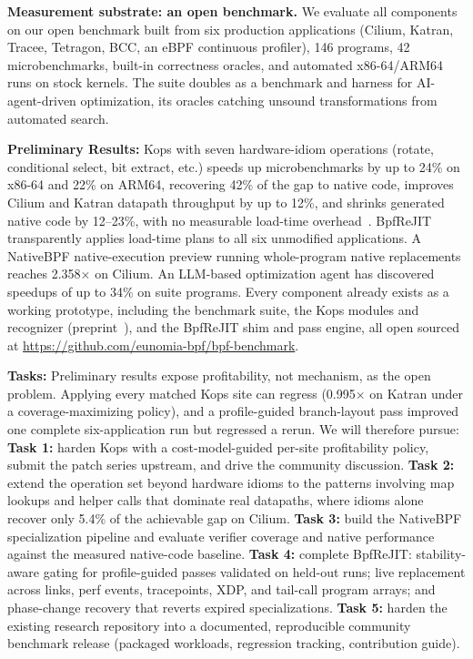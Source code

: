 \noindent\textbf{Measurement substrate: an open benchmark.}  We evaluate all components on our open benchmark built from six production applications (Cilium, Katran, Tracee, Tetragon, BCC, an eBPF continuous profiler), 146 programs, 42 microbenchmarks, built-in correctness oracles, and automated x86-64/ARM64 runs on stock kernels.  The suite doubles as a benchmark and harness for AI-agent-driven optimization, its oracles catching unsound transformations from automated search.

\noindent\textbf{Preliminary Results:} Kops with seven hardware-idiom operations (rotate, conditional select, bit extract, etc.) speeds up microbenchmarks by up to 24\% on x86-64 and 22\% on ARM64, recovering 42\% of the gap to native code, improves Cilium and Katran datapath throughput by up to 12\%, and shrinks generated native code by 12--23\%, with no measurable load-time overhead~\cite{zheng2026kops}.  BpfReJIT transparently applies load-time plans to all six unmodified applications.  A NativeBPF native-execution preview running whole-program native replacements reaches 2.358$\times$ on Cilium.  An LLM-based optimization agent has discovered speedups of up to 34\% on suite programs.  Every component already exists as a working prototype, including the benchmark suite, the Kops modules and recognizer (preprint~\cite{zheng2026kops}), and the BpfReJIT shim and pass engine, all open sourced at \url{https://github.com/eunomia-bpf/bpf-benchmark}.

\noindent\textbf{Tasks:} Preliminary results expose profitability, not mechanism, as the open problem. Applying every matched Kops site can regress (0.995$\times$ on Katran under a coverage-maximizing policy), and a profile-guided branch-layout pass improved one complete six-application run but regressed a rerun.  We will therefore pursue: \textbf{Task 1:} harden Kops with a cost-model-guided per-site profitability policy, submit the patch series upstream, and drive the community discussion.  \textbf{Task 2:} extend the operation set beyond hardware idioms to the patterns involving map lookups and helper calls that dominate real datapaths, where idioms alone recover only 5.4\% of the achievable gap on Cilium.  \textbf{Task 3:} build the NativeBPF specialization pipeline and evaluate verifier coverage and native performance against the measured native-code baseline.  \textbf{Task 4:} complete BpfReJIT: stability-aware gating for profile-guided passes validated on held-out runs; live replacement across links, perf events, tracepoints, XDP, and tail-call program arrays; and phase-change recovery that reverts expired specializations.  \textbf{Task 5:} harden the existing research repository into a documented, reproducible community benchmark release (packaged workloads, regression tracking, contribution guide).

